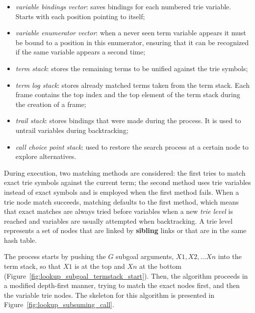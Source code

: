 \begin{itemize}
  \item \textit{variable bindings vector}: saves bindings for each numbered trie variable. Starts with each position pointing to itself;
  \item \textit{variable enumerator vector}: when a never seen term variable appears it must be bound to a position in this enumerator, ensuring that it can be recognized if the same variable appears a second time;
  \item \textit{term stack}: stores the remaining terms to be unified against the trie symbols;
  \item \textit{term log stack}: stores already matched terms taken from the term stack. Each frame contains the top index and the top element of the term stack during the creation of a frame;
  \item \textit{trail stack}: stores bindings that were made during the process. It is used to untrail variables during backtracking;
  \item \textit{call choice point stack}: used to restore the search process at a certain node to explore alternatives.
\end{itemize}

During execution, two matching methods are considered: the first tries to match exact trie symbols against the current term;
the second method uses trie variables instead of exact symbols and is employed when the first method fails.
When a trie node match succeeds, matching defaults to the first method, which means
that exact matches are always tried before variables when a new \textit{trie level} is reached and variables are usually attempted
when backtracking. A trie level represents a set of nodes that are linked by \textbf{sibling} links or that are
in the same hash table.

The process starts by pushing the $G$ subgoal arguments, $X1, X2, ...Xn$ into the term stack, so that $X1$ is at the top
and $Xn$ at the bottom (Figure~\ref{fig:lookup_subgoal_termstack_start}).
Then, the algorithm proceeds in a modified depth-first manner, trying to match the exact nodes first, and then
the variable trie nodes. The skeleton for this algorithm is presented in Figure~\ref{fig:lookup_subsuming_call}.

